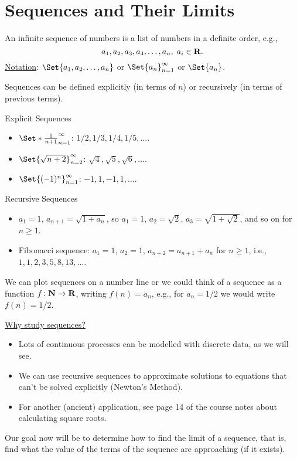 \section{Sequences and Their Limits}
\begin{Definition}{}{}
    An infinite sequence of numbers is a list of numbers in a definite order, e.g.,
    \[ a_1,a_2,a_3,a_4,\ldots,a_n,\; a_i\in\mathbf{R}. \]
    \underline{Notation}: $ \Set{a_1,a_2,\ldots,a_n} $ or $ \Set{a_n}_{n=1}^{\infty} $ or $ \Set{a_n} $.
\end{Definition}
Sequences can be defined explicitly (in terms of $ n $) or recursively (in terms of previous terms).
\begin{Example}{Explicit Sequences}{}
    \begin{itemize}
        \item $ \Set*{\frac{1}{n+1}}_{n=1}^{\infty} $: $ 1/2,1/3,1/4,1/5,\ldots $.
        \item $ \Set{\sqrt{n+2}}_{n=2}^{\infty} $: $ \sqrt{4},\sqrt{5},\sqrt{6},\ldots $.
        \item $ \Set{(-1)^n}_{n=1}^\infty $: $ -1,1,-1,1,\ldots $.
    \end{itemize}
\end{Example}
\begin{Example}{Recursive Sequences}{}
    \begin{itemize}
        \item $ a_1=1 $, $ a_{n+1}=\sqrt{1+a_n} $, so $ a_1=1 $, $ a_2=\sqrt{2} $, $ a_3=\sqrt{1+\sqrt{2}} $, and so on for $ n\ge 1 $.
        \item Fibonacci sequence: $ a_1=1 $, $ a_2=1 $, $ a_{n+2}=a_{n+1}+a_n $ for $ n\ge 1 $, i.e.,
              $ 1,1,2,3,5,8,13,\ldots $.
    \end{itemize}
\end{Example}
We can plot sequences on a number line or we could think of a sequence as a function $ f\colon \mathbf{N}\to\mathbf{R} $, writing $ f(n)=a_n $, e.g.,
for $ a_n=1/2 $ we would write $ f(n)=1/2 $.

\underline{Why study sequences?}
\begin{itemize}
    \item Lots of continuous processes can be modelled with discrete data, as we will see.
    \item We can use recursive sequences to approximate solutions to equations that can't be solved explicitly (Newton's Method).
    \item For another (ancient) application, see page 14 of the course notes about calculating square roots.
\end{itemize}
Our goal now will be to determine how to find the limit of a sequence, that is, find what the value of the terms of the sequence
are approaching (if it exists).

